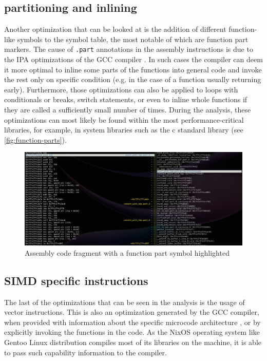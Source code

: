 \subsection{partitioning and inlining}

Another optimization that can be looked at is the addition of different function-like symbols to the symbol table, the most notable of which are function part markers.
The cause of \verb|.part| annotations in the assembly instructions is due to the IPA optimizations of the GCC compiler \cite{noauthor_ipa_nodate}.
In such cases the compiler can deem it more optimal to inline some parts of the functions into general code and invoke the rest only on specific condition (e.g. in the case of a function usually returning early).
Furthermore, those optimizations can also be applied to loops with conditionals or breaks, switch statements, or even to inline whole functions if they are called a sufficiently small number of times.
During the analysis, these optimizations can most likely be found within the most performance-critical libraries, for example, in system libraries such as the c standard library (see \autoref{fig:function-parts}).

\begin{figure}
    \centering
    \includegraphics[width=1\linewidth]{function-parts.png}
    \caption{Assembly code fragment with a function part symbol highlighted}
    \label{fig:function-parts}
\end{figure}

\subsection{SIMD specific instructions}

The last of the optimizations that can be seen in the analysis is the usage of vector instructions.
This is also an optimization generated by the GCC compiler, when provided with information about the specific microcode architecture \cite{noauthor_x86_nodate}, or by explicitly invoking the functions in the code.
As the NixOS operating system like Gentoo Linux distribution compiles most of its libraries on the machine, it is able to pass such capability information to the compiler.

